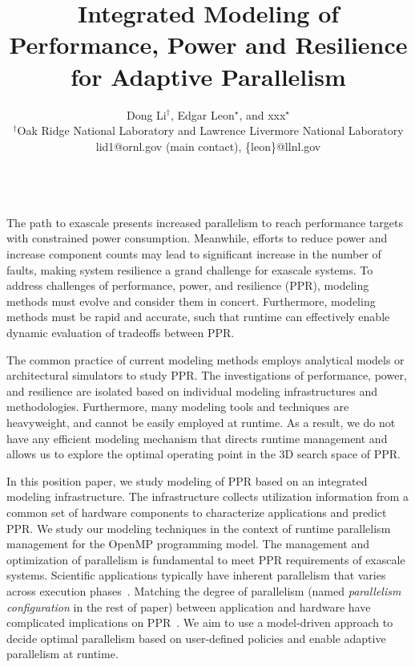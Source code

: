 \documentclass{article}  %
\begin{document}
\title{Integrated Modeling of Performance, Power and Resilience for Adaptive Parallelism}

\author{Dong Li$^{\dag}$, Edgar Leon$^{\star}$, and xxx$^{\star}$ \\
    $^{\dag}$Oak Ridge National Laboratory and Lawrence Livermore National Laboratory \\
    lid1@ornl.gov (main contact), \{leon\}@llnl.gov	\\
}

\date{}

\maketitle

   \\
The path to exascale presents increased parallelism to reach performance targets with constrained power consumption.
Meanwhile, efforts to reduce power and increase component counts may lead to significant increase in the number of faults,
making system resilience a grand challenge for exascale systems. To address challenges of 
performance, power, and resilience (PPR), modeling methods must evolve and consider
them in concert. Furthermore, modeling methods must be rapid and accurate, such that
runtime can effectively enable dynamic evaluation of tradeoffs between PPR.

The common practice of current modeling methods employs analytical models or architectural simulators to study PPR.
The investigations of performance, power, and resilience are isolated based on individual modeling infrastructures
and methodologies.
Furthermore, many modeling tools and techniques are heavyweight, and cannot be easily employed at runtime.
As a result, we do not have any efficient modeling mechanism that directs runtime management 
and allows us to explore the optimal operating point in the 3D search space of PPR.

In this position paper, we study modeling of PPR based on an integrated %
modeling infrastructure. 
The infrastructure collects utilization information from 
a common set of hardware components to characterize applications and predict PPR.
We study our modeling techniques in the context of runtime parallelism management for the OpenMP
programming model.
The management and optimization of parallelism is fundamental to meet PPR requirements
of exascale systems.
Scientific applications typically have inherent parallelism that varies across execution phases~\cite{nvram_ipdps12}.
Matching the degree of parallelism (named \textit{parallelism configuration} in the rest of paper) between application and hardware
have complicated implications on PPR~\cite{mpiopenmp_ipdps10, mpiopenmp_tpds13, dsn_pact08, dsn_ics06}. 
We aim to use a model-driven approach to decide optimal parallelism based on user-defined policies
and enable adaptive parallelism at runtime.
\end{document}
